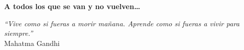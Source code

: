 \thispagestyle{empty}

\begin{flushright}

  \vspace*{\fill}

  \textbf{A todos los que se van y no vuelven\ldots}\\

  \vspace{3cm}

  \emph{``Vive como si fueras a morir mañana. Aprende como si fueras a vivir para siempre.''}\\ Mahatma Gandhi

\end{flushright}  

\vspace{4cm}
\vspace*{\fill}